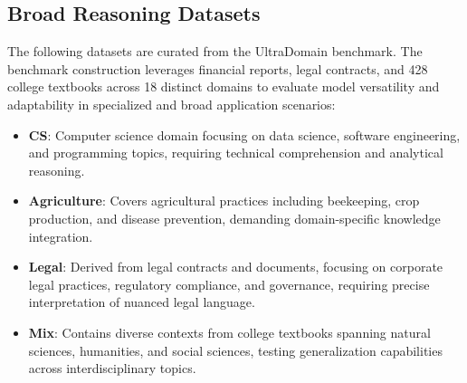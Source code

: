\subsection{Broad Reasoning Datasets}
The following datasets are curated from the UltraDomain \citep{qian2025memorag} benchmark. The benchmark construction leverages financial reports, legal contracts, and 428 college textbooks across 18 distinct domains to evaluate model versatility and adaptability in specialized and broad application scenarios:
\begin{itemize}
    \item \textbf{CS}: Computer science domain focusing on data science, software engineering, and programming topics, requiring technical comprehension and analytical reasoning.
    \item \textbf{Agriculture}: Covers agricultural practices including beekeeping, crop production, and disease prevention, demanding domain-specific knowledge integration.
    \item \textbf{Legal}: Derived from legal contracts and documents, focusing on corporate legal practices, regulatory compliance, and governance, requiring precise interpretation of nuanced legal language.
    \item \textbf{Mix}: Contains diverse contexts from college textbooks spanning natural sciences, humanities, and social sciences, testing generalization capabilities across interdisciplinary topics.
\end{itemize}